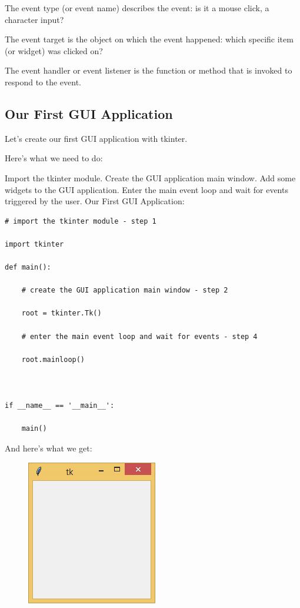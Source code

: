 \documentclass{article}
\begin{document}
The event type (or event name) describes the event:  is it a mouse click, a character input?

The event target is the object on which the event happened:  which specific item (or widget) was clicked on?  

The event handler or event listener is the function or method that is invoked to respond to the event.

\subsection{Our First GUI Application}
Let’s create our first GUI application with tkinter.

Here's what we need to do:

Import the tkinter module.
Create the GUI application main window.
Add some widgets to the GUI application.
Enter the main event loop and wait for events triggered by the user.
Our First GUI Application:

\begin{lstlisting}
# import the tkinter module - step 1

import tkinter

def main():

    # create the GUI application main window - step 2

    root = tkinter.Tk()

    # enter the main event loop and wait for events - step 4

    root.mainloop()

 

if __name__ == '__main__':

    main()
\end{lstlisting}

And here's what we get:
\begin{figure}[h]
\includegraphics[scale=.6]{firstgui}\\
\end{figure}
\end{document}
